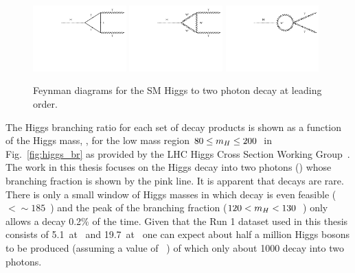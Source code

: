 \begin{figure}
  \includegraphics[width=0.32\textwidth]{theory/plots/Htgg.pdf}
  \includegraphics[width=0.32\textwidth]{theory/plots/HWgg.pdf}
  \includegraphics[width=0.32\textwidth]{theory/plots/HWgg4.pdf}
  \caption{Feynman diagrams for the \acs{SM} Higgs to two photon decay at leading order.}
  \label{fig:feyn_hgg_decay}
\end{figure}


The \SM Higgs branching ratio for each set of decay products is shown as a function of the Higgs mass, \mH, for the low mass region $80\leq m_{H}\leq 200$~\GeV in Fig.~\ref{fig:higgs_br} as provided by the LHC Higgs Cross Section Working Group~\cite{LHCHiggsCrossSectionWorkingGroup3}. The work in this thesis focuses on the Higgs decay into two photons (\Hgg) whose branching fraction is shown by the pink line. It is apparent that \Hgg decays are rare. There is only a small window of Higgs masses in which \Hgg decay is even feasible (\mH$<\sim185$~\GeV) and the peak of the branching fraction ($120<m_{H}<130$~\GeV) only allows a \SM \Hgg decay 0.2\% of the time. Given that the \LHC Run 1 dataset used in this thesis consists of 5.1~\fbinv at ~\TeV and 19.7~\fbinv at ~\TeV one can expect about half a million \SM Higgs bosons to be produced (assuming a value of ~\GeV) of which only about 1000 decay into two photons.

